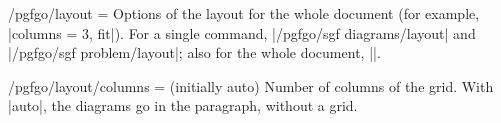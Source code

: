 \begin{codeexample}
\end{codeexample}


\begin{stylekey}{/pgfgo/layout = }
	Options of the layout for the whole document (for example, |columns = 3, fit|). For a single command, |/pgfgo/sgf diagrams/layout| and |/pgfgo/sgf problem/layout|; also for the whole document, ||.
\end{stylekey}

\begin{key}{/pgfgo/layout/columns =  (initially auto)}
	Number of columns of the grid. With |auto|, the diagrams go in the paragraph, without a grid.
\end{key}

